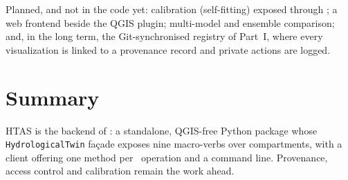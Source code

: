 Planned, and not in the code yet: calibration (self-fitting) exposed through
\cwv; a web frontend beside the QGIS plugin; multi-model and ensemble
comparison; and, in the long term, the Git-synchronised registry of Part~I,
where every visualization is linked to a provenance record and private actions
are logged.


\section{Summary}

HTAS is the backend of \cwv: a standalone, QGIS-free Python package whose
\texttt{HydrologicalTwin} façade exposes nine macro-verbs over compartments,
with a client offering one method per \cwv\ operation and a command line.
Provenance, access control and calibration remain the work ahead.
